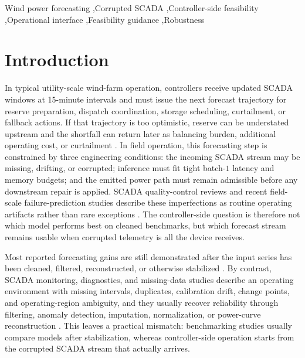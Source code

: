 \documentclass[review,1p,times]{elsarticle}
\begin{document}
\begin{frontmatter}
\begin{keyword}
Wind power forecasting \sep Corrupted SCADA \sep Controller-side feasibility \sep Operational interface \sep Feasibility guidance \sep Robustness
\end{keyword}

\end{frontmatter}

\linenumbers

\section{Introduction}
\label{sec:intro}

In typical utility-scale wind-farm operation, controllers receive updated SCADA windows at 15-minute intervals and must issue the next forecast trajectory for reserve preparation, dispatch coordination, storage scheduling, curtailment, or fallback actions. If that trajectory is too optimistic, reserve can be understated upstream and the shortfall can return later as balancing burden, additional operating cost, or curtailment \citep{wang2011wind,houben2023optimal,yan2025economicvalue,khaloie2020coordinated,li2024opf_highren}. In field operation, this forecasting step is constrained by three engineering conditions: the incoming SCADA stream may be missing, drifting, or corrupted; inference must fit tight batch-$1$ latency and memory budgets; and the emitted power path must remain admissible before any downstream repair is applied. SCADA quality-control reviews and recent field-scale failure-prediction studies describe these imperfections as routine operating artifacts rather than rare exceptions \citep{tautzweinert2017review,leahy2019dataquality,maldonadocorrea2020slr,sheng2025annreview,vervlimmeren2025scalable,martincalzada2025optimized}. The controller-side question is therefore not which model performs best on cleaned benchmarks, but which forecast stream remains usable when corrupted telemetry is all the device receives.

Most reported forecasting gains are still demonstrated after the input series has been cleaned, filtered, reconstructed, or otherwise stabilized \citep{verdone2025review,zhang2021windreview,duan2025robust,zhu2025realtime,ma2022gcnwind,gao2025mmgpt,wu2024stellm,liu2019dataprocessing,wang2021datacleaning}. By contrast, SCADA monitoring, diagnostics, and missing-data studies describe an operating environment with missing intervals, duplicates, calibration drift, change points, and operating-region ambiguity, and they usually recover reliability through filtering, anomaly detection, imputation, normalization, or power-curve reconstruction \citep{maldonadocorrea2020slr,sheng2025annreview,yang2013condition,bangalore2018earlyfault,leahy2019dataquality,letzgus2020,renstrom2020autoencoder,vervlimmeren2025scalable,martincalzada2025optimized,tawn2020missingdata,wen2024fcsmissing}. This leaves a practical mismatch: benchmarking studies usually compare models after stabilization, whereas controller-side operation starts from the corrupted SCADA stream that actually arrives.
\end{document}
